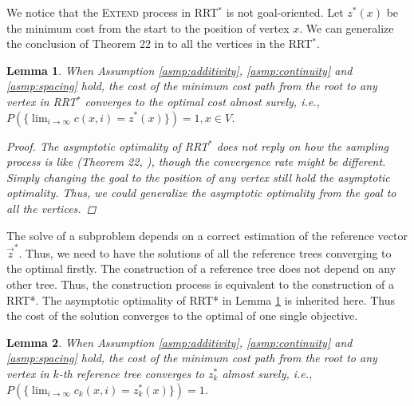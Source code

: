 \documentclass[conference]{IEEEtran}
\newtheorem{lem}{Lemma}
\begin{document}
We notice that the \textsc{Extend} process in RRT$^{*}$ is not goal-oriented.
Let $ z^{*}(x) $ be the minimum cost from the start to the position of vertex $ x $.
We can generalize the conclusion of Theorem 22 in \cite{Karaman.Frazzoli:RSS10} to all the vertices in the RRT$^{*}$.
\begin{lem}
\label{lem:tree_vex:conv}
When Assumption \ref{asmp:additivity}, \ref{asmp:continuity} and \ref{asmp:spacing} hold,
the cost of the minimum cost path from the root to any vertex in RRT$^{*}$ converges to the optimal cost almost surely, i.e.,
$
P( \{ \lim_{ i \rightarrow \infty } c(x, i)  = z^{*}(x) \} ) = 1, x \in V $.
\begin{proof}
The asymptotic optimality of RRT$^{*}$ does not reply on how the sampling process is like (Theorem 22, \cite{Karaman.Frazzoli:RSS10}), though the convergence rate might be different.
Simply changing the goal to the position of any vertex still hold the asymptotic optimality.
Thus, we could generalize the asymptotic optimality from the goal to all the vertices.
\end{proof}
\end{lem}

The solve of a subproblem depends on a correct estimation of the reference vector $ \vec{z}^{*} $.
Thus, we need to have the solutions of all the reference trees converging to the optimal firstly.
The construction of a reference tree does not depend on any other tree.
Thus, the construction process is equivalent to the construction of a RRT*.
The asymptotic optimality of RRT* in Lemma \ref{lem:tree_vex:conv} is inherited here.
Thus the cost of the solution converges to the optimal of one single objective.
\begin{lem}
\label{lem:ref_tree:conv}
When Assumption \ref{asmp:additivity}, \ref{asmp:continuity} and \ref{asmp:spacing} hold,
the cost of the minimum cost path from the root to any vertex in $ k $-th reference tree converges to $ z^{*}_{k} $ almost surely, i.e., 
$ P( \{ \lim_{ i \rightarrow \infty }  c_{k} (x, i ) = z^{*}_{k} (x) \} ) = 1  $.
\end{lem}
\end{document}
